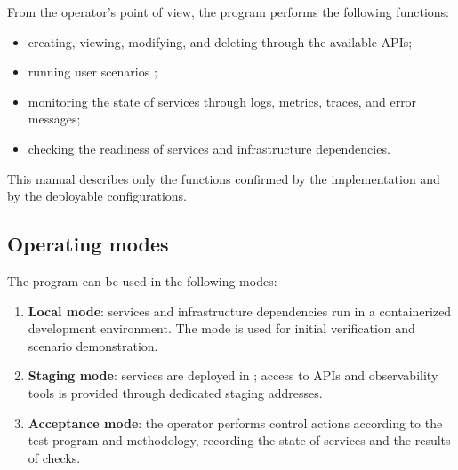 \documentclass[12pt,a4paper]{extarticle}
\begin{document}
\begin{hseExample}
From the operator's point of view, the program performs the following functions:

\begin{itemize}[leftmargin=1.25cm]
    \item creating, viewing, modifying, and deleting  through the available APIs;
    \item running user scenarios ;
    \item monitoring the state of services through logs, metrics, traces, and error messages;
    \item checking the readiness of services and infrastructure dependencies.
\end{itemize}

This manual describes only the functions confirmed by the implementation and by the deployable configurations.
\end{hseExample}

\subsection{Operating modes}

\begin{hseExample}
The program can be used in the following modes:

\begin{enumerate}[label=\arabic*), leftmargin=1.25cm]
    \item \textbf{Local mode}: services and infrastructure dependencies run in a containerized development environment. The mode is used for initial verification and scenario demonstration.
    \item \textbf{Staging mode}: services are deployed in ; access to APIs and observability tools is provided through dedicated staging addresses.
    \item \textbf{Acceptance mode}: the operator performs control actions according to the test program and methodology, recording the state of services and the results of checks.
\end{enumerate}
\end{hseExample}

\clearpage
\end{document}
